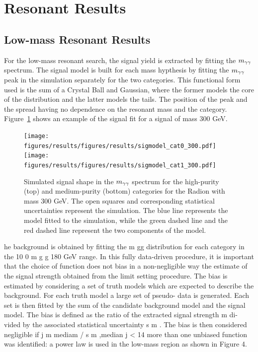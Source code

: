 \section{Resonant Results\label{sec:resresults}}

\subsection{Low-mass Resonant Results}

For the low-mass resonant search, the signal yield is extracted by fitting the $m_{\gamma\gamma}$ spectrum.
The signal model is built for each mass hypthesis by fitting the $m_{\gamma\gamma}$ peak in the simulation
separately for the two categories. This functional form used is the sum of a Crystal Ball and
Gaussian, where the former models the core of the distribution and the latter models the
tails. The position of the peak and the spread having no dependence on the resonant mass and the
category. Figure~\ref{fig:sigfit_300} shows an example of the signal fit for a signal of mass 300 GeV.

\begin{figure}[ht]
 \begin{center}
   \texttt{[image: figures/results/figures/results/sigmodel\_cat0\_300.pdf]}
   \texttt{[image: figures/results/figures/results/sigmodel\_cat1\_300.pdf]}
 \end{center}
\caption{Simulated signal shape in the $m_{\gamma\gamma}$ spectrum for the high-purity (top) and medium-purity
(bottom) categories for the Radion with mass 300 GeV. The open squares and corresponding
statistical uncertainties represent the simulation.
The blue line represents the model fitted to the simulation, while the green dashed line
and the red dashed line represent the two components of the model.}
\label{fig:sigfit_300}
\end{figure}

he  background  is  obtained  by  fitting  the
m
gg
distribution  for  each  category  in  the  10
0
m
g
g
180 GeV range.  In this fully data-driven procedure, it is important that the choice of
function  does  not  bias  in  a  non-negligible  way  the  estimate  of  the  signal  strength  obtained
from the limit setting procedure.  The bias is estimated by considering a set of truth models
which are expected to describe the background.  For each truth model a large set of pseudo-
data  is  generated.   Each  set  is  then  fitted  by  the  sum  of  the  candidate  background  model
and the signal model.   The bias is defined as the ratio of the extracted signal strength
m
di-
vided  by  the  associated  statistical  uncertainty
s
m
.   The  bias  is  then  considered  negligible  if
j
m
mediam
/
s
m
,median
j
<
14%
more than one unbiased function was identified:  a power law is used in the low-mass region
as shown in Figure 4.

